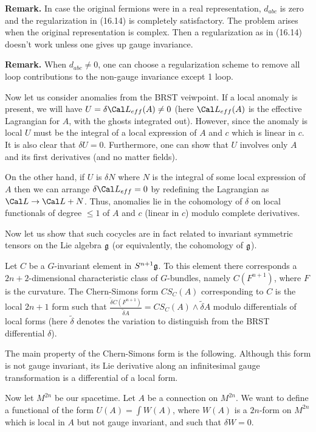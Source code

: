 {\bf Remark.} In case the original fermions were in a real representation,
$d_{abc}$ is zero and 
the regularization in (16.14) is completely satisfactory.
The problem arises when the original representation is complex.
Then a regularization as in (16.14) doesn't work unless one gives up
gauge invariance. 

{\bf Remark.} When $d_{abc}\ne 0$, one can choose a regularization scheme 
to remove all loop contributions to the non-gauge invariance except 1 loop. 

Now let us consider anomalies from the BRST veiwpoint. 
If a local anomaly is present, 
we will have $U=\delta \Cal L_{eff}(A)\ne 0$
(here $\Cal L_{eff}(A)$ is the effective Lagrangian for $A$, with the 
ghosts integrated out). However, 
since the anomaly is local
$U$ must be the integral of a local 
expression of $A$ and $c$ which is linear in $c$. It is also clear that 
$\delta U=0$. Furthermore, one can show that $U$ involves only 
$A$ and its first derivatives (and no matter fields).  

On the other hand, if 
$U$ is $\delta N$ where $N$ is the integral of 
some local expression of $A$ then we can arrange 
$\delta \Cal L_{eff}=0$ by redefining the 
Lagrangian as $\Cal L\to\Cal L+N$. Thus,   
anomalies lie in the cohomology of $\delta$ on local functionals 
of degree $\le 1$ of $A$ and $c$ (linear in $c$) 
modulo complete derivatives. 

Now let us show that such cocycles are in fact related to 
invariant symmetric tensors on the Lie algebra $\frak g$
(or equivalently, the cohomology of $\frak g$). 

Let $C$ be a $G$-invariant element in $S^{n+1}\frak g$. 
To this element there corresponds 
a $2n+2$-dimensional 
characteristic class of $G$-bundles, namely $C(F^{n+1})$, where $F$ 
is the curvature. The Chern-Simons form $CS_C(A)$ corresponding to $C$ is 
the local $2n+1$ form such that $\frac{\tilde\delta C(F^{n+1})}
{\tilde\delta A}=
CS_C(A)\wedge \tilde\delta A$ modulo differentials of local forms
(here $\tilde\delta$ denotes the variation to distinguish from the 
BRST differential $\delta$). 

The main property of the Chern-Simons form is the following. 
Although this form is not gauge invariant, its Lie derivative along 
an infinitesimal gauge transformation is a differential of a local form. 

Now let $M^{2n}$ be our spacetime. Let $A$ be a connection on $M^{2n}$. 
We want to define a functional of the form $U(A)=\int W(A)$, where 
$W(A)$ is a $2n$-form on $M^{2n}$ which is local in $A$ but not gauge 
invariant, and such that $\delta W=0$. 
 
